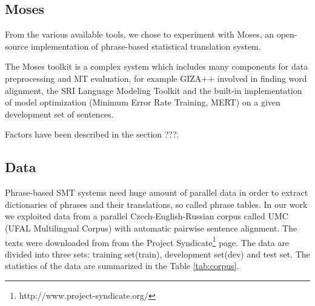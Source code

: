 \documentclass[11pt,letterpaper]{article}
\begin{document}
\subsection{Moses}
From the various available tools, we chose to experiment with Moses, an open-source implementation of phrase-based statistical translation system.

The Moses toolkit \cite{moses} is a complex system which includes many components
for data preprocessing and MT evaluation, for example
GIZA++ %
involved in finding word alignment, the SRI Language Modeling
Toolkit %
and the built-in implementation of model optimization (Minimum Error Rate Training, MERT) on a
given development set of sentences.


Factors have been described in the section ???.

\subsection{Data}
Phrase-based SMT systems need huge amount of parallel data in order to
extract dictionaries of phrases and their translations, so called phrase tables.
In our work we exploited data from a parallel Czech-English-Russian
corpus called UMC (UFAL Multilingual Corpus) with automatic pairwise sentence
alignment. The texts were downloaded from from the Project
Syndicate\footnote{http://www.project-syndicate.org/} page. 
The data are divided into three sets: training set(train),
development set(dev) and test set.
The statistics of the data are summarized in the Table \ref{tab:corpus}.
\end{document}
